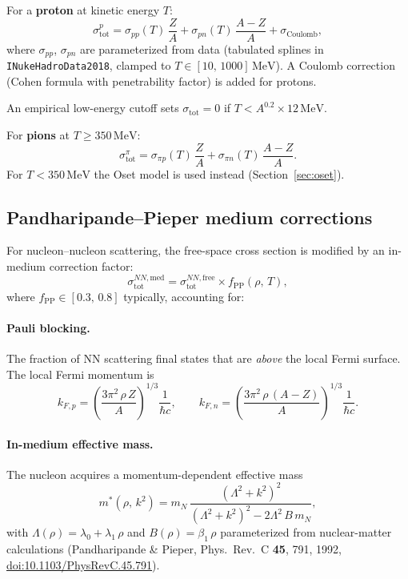 \documentclass[11pt,a4paper]{article}
\newcommand{\unit}[1]{\,\mathrm{#1}}
\newcommand{\MeV}{\unit{MeV}}
\begin{document}
For a \textbf{proton} at kinetic energy $T$:
\begin{equation}
  \sigma_{\text{tot}}^{p}
  = \sigma_{pp}(T)\,\frac{Z}{A}
  + \sigma_{pn}(T)\,\frac{A-Z}{A}
  + \sigma_{\text{Coulomb}},
\end{equation}
where $\sigma_{pp}$, $\sigma_{pn}$ are parameterized from data
(tabulated splines in \texttt{INukeHadroData2018}, clamped to
$T \in [10,\,1000]\MeV$).  A Coulomb correction (Cohen formula with
penetrability factor) is added for protons.

An empirical low-energy cutoff sets $\sigma_{\text{tot}} = 0$ if
$T < A^{0.2} \times 12\MeV$.

For \textbf{pions} at $T \ge 350\MeV$:
\begin{equation}
  \sigma_{\text{tot}}^{\pi}
  = \sigma_{\pi p}(T)\,\frac{Z}{A}
  + \sigma_{\pi n}(T)\,\frac{A-Z}{A}.
\end{equation}
For $T < 350\MeV$ the Oset model is used instead
(Section~\ref{sec:oset}).

\subsection{Pandharipande--Pieper medium corrections}
\label{sec:pp}

For nucleon--nucleon scattering, the free-space cross section is modified
by an in-medium correction factor:
\begin{equation}
  \sigma_{\text{tot}}^{NN,\text{med}}
  = \sigma_{\text{tot}}^{NN,\text{free}}
    \times f_{\text{PP}}(\rho,\,T),
\end{equation}
where $f_{\text{PP}} \in [0.3,\,0.8]$ typically, accounting for:

\paragraph{Pauli blocking.}
The fraction of NN scattering final states that are \emph{above} the local
Fermi surface.  The local Fermi momentum is
\begin{equation}
  k_{F,p} = \left(\frac{3\pi^{2}\,\rho\,Z}{A}\right)^{\!1/3}\!\!\frac{1}{\hbar c},
  \qquad
  k_{F,n} = \left(\frac{3\pi^{2}\,\rho\,(A-Z)}{A}\right)^{\!1/3}\!\!\frac{1}{\hbar c}.
\end{equation}

\paragraph{In-medium effective mass.}
The nucleon acquires a momentum-dependent effective mass
\begin{equation}
  m^{*}(\rho,\,k^{2})
  = m_{N}\,\frac{(\Lambda^{2} + k^{2})^{2}}
               {(\Lambda^{2} + k^{2})^{2} - 2\Lambda^{2}\,B\,m_{N}},
\end{equation}
with $\Lambda(\rho) = \lambda_{0} + \lambda_{1}\,\rho$ and
$B(\rho) = \beta_{1}\,\rho$ parameterized from nuclear-matter
calculations (Pandharipande \& Pieper, Phys.\ Rev.\ C \textbf{45}, 791, 1992,
\href{https://doi.org/10.1103/PhysRevC.45.791}{doi:10.1103/PhysRevC.45.791}).
\end{document}
